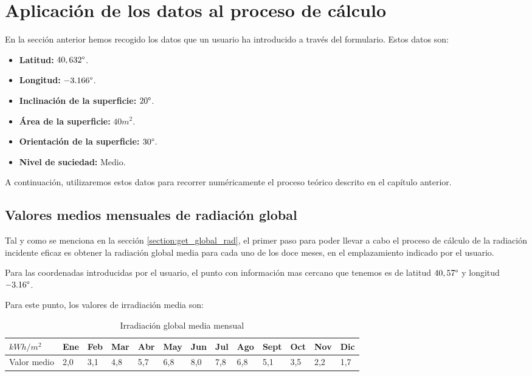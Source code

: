 \section {Aplicación de los datos al proceso de cálculo}

En la sección anterior hemos recogido los datos que un usuario ha introducido a través del formulario. Estos datos son:
\begin{itemize}
\item \textbf{Latitud:} $40,632 \degree$.
\item \textbf{Longitud:} $-3.166 \degree$.
\item \textbf{Inclinación de la superficie:} $20 \degree$.
\item \textbf{Área de la superficie:} $40 m^2 $.
\item \textbf{Orientación de la superficie:} $30 \degree$.
\item \textbf{Nivel de suciedad:} Medio.
\end{itemize}

A continuación, utilizaremos estos datos para recorrer numéricamente el proceso teórico descrito en el capítulo anterior. 

\subsection{Valores medios mensuales de radiación global}

Tal y como se menciona en la sección \ref{section:get_global_rad}, el primer paso para poder llevar a cabo el proceso de cálculo de la radiación incidente eficaz es obtener la radiación global media para cada uno de los doce meses, en el emplazamiento indicado por el usuario.

Para las coordenadas introducidas por el usuario, el punto con información mas cercano que tenemos es de latitud  $40,57 \degree$ y longitud $-3.16 \degree$. 

Para este punto, los valores de irradiación media son:
\begin{table}[ht]
\centering
\begin{tabular}{|l|l|l|l|l|l|l|l|l|l|l|l|l|}
\hline
$kWh/m^2$   & Ene & Feb & Mar & Abr & May & Jun & Jul & Ago & Sept & Oct & Nov & Dic \\ \hline
Valor medio & 2,0 & 3,1 & 4,8 & 5,7 & 6,8 & 8,0 & 7,8 & 6,8 & 5,1  & 3,5 & 2,2 & 1,7 \\ \hline
\end{tabular}
\label{tab:mean_values_monthly}
\caption{Irradiación global media mensual}
\end{table}

